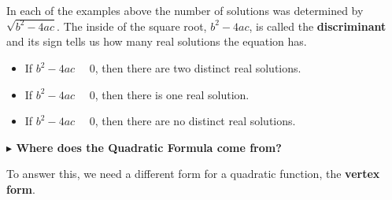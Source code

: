 \documentclass{ximera}
\begin{document}
In each of the examples above the number of solutions was determined by $\sqrt{b^2 - 4 a c}$.  The inside of the square root, $b^2 - 4 a c$, is called the \textbf{discriminant} and its sign tells us how many real solutions the equation has.


\begin{itemize}
\item If $b^2 - 4 a c$ \, \wordChoice{\choice[correct]{$>$}\choice{$=$}\choice{$<$}} \, $0$, then there are two distinct real solutions.
\item If $b^2 - 4 a c$ \, \wordChoice{\choice{$>$}\choice[correct]{$=$}\choice{$<$}} \, $0$, then there is one real solution.
\item If $b^2 - 4 a c$ \, \wordChoice{\choice{$>$}\choice{$=$}\choice[correct]{$<$}} \, $0$, then there are no distinct real solutions.

\end{itemize}








\textbf{\textcolor{purple!85!blue}{$\blacktriangleright$ Where does the Quadratic Formula come from?}} 

To answer this, we need a different form for a quadratic function, the \textbf{vertex form}.
\end{document}
